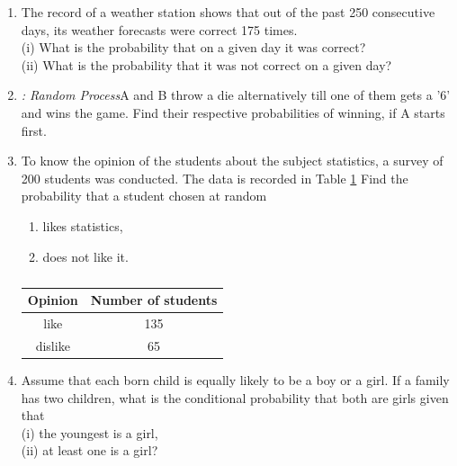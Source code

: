 \begin{enumerate}[label=\thesection.\arabic*.,ref=\thesection.\theenumi]
   \item The record of a weather station shows that out of the past 250 consecutive days, its weather forecasts were correct 175 times.\\
   (i) What is the probability that on a given day it was correct?\\
(ii) What is the probability that it was not correct on a given day?\\
\solution



\item {\em: Random Process}A and B throw a die alternatively till one of them gets a '6' and wins the game. Find their respective probabilities of winning, if A starts first.
\\
\solution

%
\item To know the opinion of the students about the subject statistics, a survey of 200 students was conducted. The data is recorded in Table \ref{table:1.2.6}
Find the probability that a student chosen at random
\begin{enumerate}
\item likes statistics,
\item  does not like it.
\end{enumerate}
\begin{table}[!ht]
\centering
\begin{tabular}{ |c|c| } 
 \hline
 \textbf{Opinion} &\textbf{Number of students}\\
 \hline
 like  &135\\ 
 \hline
 dislike  &65\\ 
 \hline
\end{tabular}
\caption{}
\label{table:1.2.6}
\end{table}
\solution

\item  Assume that each born child is equally likely to be a boy or a girl. If a family has two children, what is the conditional probability that both are girls given that\\
(i) the youngest is a girl,\\ 
(ii) at least one is a girl?\\
\solution



\end{enumerate}
